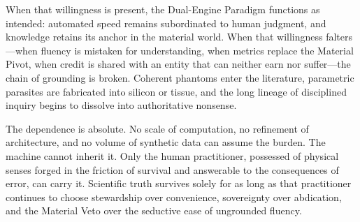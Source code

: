 When that willingness is present, the Dual-Engine Paradigm functions as intended: automated speed remains subordinated to human judgment, and knowledge retains its anchor in the material world. When that willingness falters—when fluency is mistaken for understanding, when metrics replace the Material Pivot, when credit is shared with an entity that can neither earn nor suffer—the chain of grounding is broken. Coherent phantoms enter the literature, parametric parasites are fabricated into silicon or tissue, and the long lineage of disciplined inquiry begins to dissolve into authoritative nonsense.

The dependence is absolute. No scale of computation, no refinement of architecture, and no volume of synthetic data can assume the burden. The machine cannot inherit it. Only the human practitioner, possessed of physical senses forged in the friction of survival and answerable to the consequences of error, can carry it. Scientific truth survives solely for as long as that practitioner continues to choose stewardship over convenience, sovereignty over abdication, and the Material Veto over the seductive ease of ungrounded fluency.
